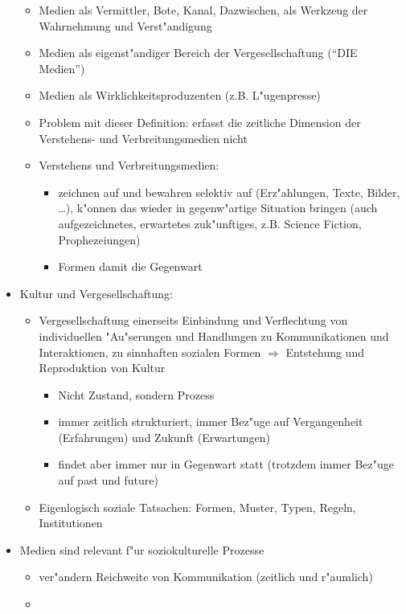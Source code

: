 \begin{itemize}
\begin{itemize}
			\item
				Medien als Vermittler, Bote, Kanal, Dazwischen, als Werkzeug der Wahrnehmung und Verst"andigung
			\item
				Medien als eigenst"andiger Bereich der Vergesellschaftung (\enquote{DIE Medien})
			\item
				Medien als Wirklichkeitsproduzenten (z.B. L"ugenpresse)
			\item
				Problem mit dieser Definition: erfasst die zeitliche Dimension der Verstehens- und Verbreitungsmedien nicht
			\item
				Verstehens und Verbreitungsmedien:
				\begin{itemize}
					\item
						zeichnen auf und bewahren selektiv auf (Erz"ahlungen, Texte, Bilder, \dots), k"onnen das wieder in gegenw"artige Situation bringen (auch aufgezeichnetes, erwartetes zuk"unftiges, z.B. Science Fiction, Prophezeiungen)
					\item
						Formen damit die Gegenwart
				\end{itemize}
		\end{itemize}
	\item
		Kultur und Vergesellschaftung:
		\begin{itemize}
			\item
				Vergesellschaftung einerseits Einbindung und Verflechtung von individuellen "Au"serungen und Handlungen zu Kommunikationen und Interaktionen, zu sinnhaften sozialen Formen $\Rightarrow$ Entstehung und Reproduktion von Kultur
				\begin{itemize}
					\item
						Nicht Zustand, sondern Prozess
					\item
						immer zeitlich strukturiert, immer Bez"uge auf Vergangenheit (Erfahrungen) und Zukunft (Erwartungen)
					\item
						findet aber immer nur in Gegenwart statt (trotzdem immer Bez"uge auf past und future)
				\end{itemize}
			\item
				Eigenlogisch soziale Tatsachen: Formen, Muster, Typen, Regeln, Institutionen
		\end{itemize}
	\item
		Medien sind relevant f"ur soziokulturelle Prozesse
		\begin{itemize}
			\item
				ver"andern Reichweite von Kommunikation (zeitlich und r"aumlich)
			\item

\end{itemize}
\end{itemize}
